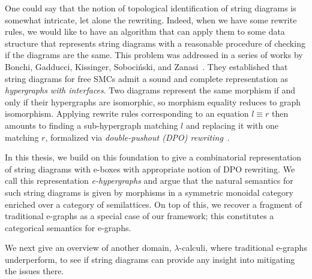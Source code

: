 One could say that the notion of topological identification of string diagrams is somewhat intricate, let alone the rewriting.
Indeed, when we have some rewrite rules, we would like to have an algorithm that can apply them to some data structure that represents string diagrams with a reasonable procedure of checking if the diagrams are the same.
This problem was addressed in a series of works by Bonchi, Gadducci, Kissinger, Sobociński, and Zanasi~\cite{bonchi_string_2022-1,bonchi_string_2022-2,bonchi_string_2022-3}.
They established that string diagrams for free SMCs admit a sound and complete representation as \emph{hypergraphs with interfaces}.
Two diagrams represent the same morphism if and only if their hypergraphs are isomorphic, so morphism equality reduces to graph isomorphism.
Applying rewrite rules corresponding to an equation $l \equiv r$ then amounts to finding a sub-hypergraph matching $l$ and replacing it with one matching $r$, formalized via \emph{double-pushout (DPO) rewriting}~\cite{dpo}.

In this thesis, we build on this foundation to give a combinatorial representation of string diagrams with e-boxes with appropriate notion of DPO rewriting.
We call this representation \emph{e-hypergraphs} and argue that the natural semantics for such string diagrams is given by morphisms in a symmetric monoidal category enriched over a category of semilattices.
On top of this, we recover a fragment of traditional e-graphs as a special case of our framework; this constitutes a categorical semantics for e-graphs.

We next give an overview of another domain, $\lambda$-calculi, where traditional e-graphs underperform, to see if string diagrams can provide any insight into mitigating the issues there.
